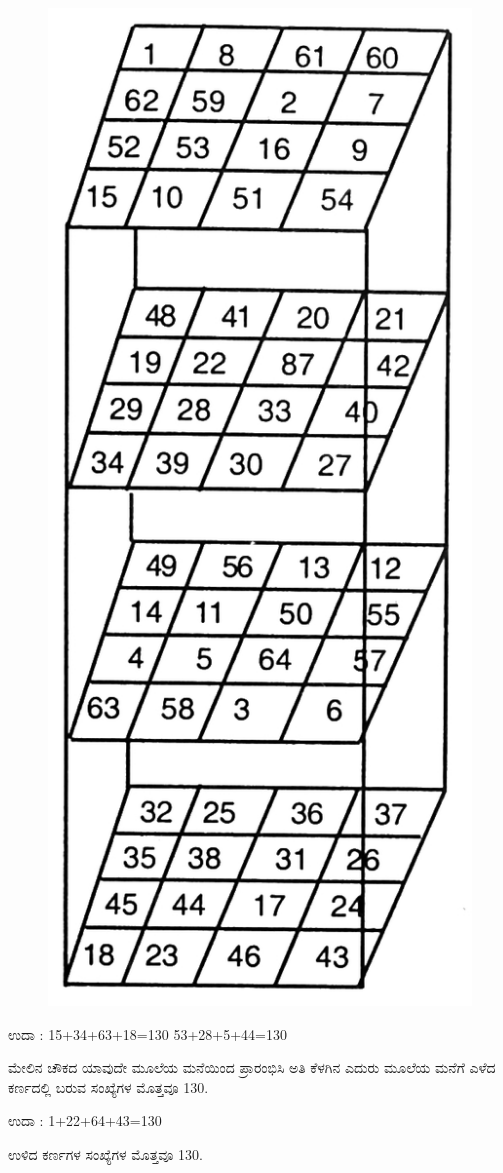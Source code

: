 \begin{minipage}{4cm}
\begin{figure}[H]
\includegraphics{src/figures/chap8/fig8-11.jpg}
\end{figure}
\end{minipage}
\quad
\begin{minipage}{5.5cm}
ಉದಾ : 15+34+63+18=130 53+28+5+44=130

ಮೇಲಿನ ಚೌಕದ ಯಾವುದೇ ಮೂಲೆಯ ಮನೆಯಿಂದ ಪ್ರಾರಂಭಿಸಿ ಅತಿ ಕೆಳಗಿನ ಎದುರು ಮೂಲೆಯ ಮನೆಗೆ ಎಳೆದ ಕರ್ಣದಲ್ಲಿ ಬರುವ ಸಂಖ್ಯೆಗಳ ಮೊತ್ತವೂ 130.

ಉದಾ : 1+22+64+43=130

ಉಳಿದ ಕರ್ಣಗಳ ಸಂಖ್ಯೆಗಳ ಮೊತ್ತವೂ 130.
\end{minipage}

